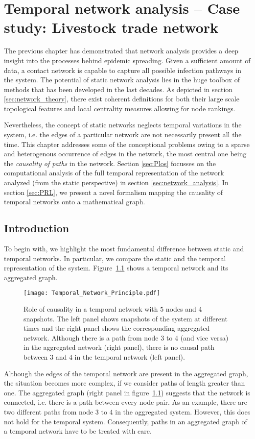 \chapter{Temporal network analysis -- Case study: Livestock trade network}\label{sec:temporal_networks}
The previous chapter has demonstrated that network analysis provides a deep insight into the processes behind epidemic spreading.
Given a sufficient amount of data, a contact network is capable to capture all possible infection pathways in the system.
The potential of static network analysis lies in the huge toolbox of methods that has been developed in the last decades.
As depicted in section \ref{sec:network_theory}, there exist coherent definitions for both their large scale topological features and local centrality measures allowing for node rankings.

Nevertheless, the concept of static networks neglects temporal variations in the system, i.e. the edges of a particular network are not necessarily present all the time.
This chapter addresses some of the conceptional problems owing to a sparse and heterogenous occurrence of edges in the network, the most central one being the \emph{causality of paths} in the network.
Section \ref{sec:Plos} focusses on the computational analysis of the full temporal representation of the network analyzed (from the static perspective) in section \ref{sec:network_analysis}.
In section \ref{sec:PRL}, we present a novel formalism mapping the causality of temporal networks onto a mathematical graph.

\section{Introduction}
To begin with, we highlight the most fundamental difference between static and temporal networks.
In particular, we compare the static and the temporal representation of the system.
Figure~\ref{fig:temporal_network_principle} shows a temporal network and its aggregated graph.
%
\begin{figure}[htb]
\begin{center}
\texttt{[image: Temporal\_Network\_Principle.pdf]}
\caption{%
Role of causality in a temporal network with $5$ nodes and $4$ snapshots.
The left panel shows snapshots of the system at different times and the right panel shows the corresponding aggregated network.
Although there is a path from node $3$ to $4$ (and vice versa) in the aggregated network (right panel), there is no causal path between $3$ and $4$ in the temporal network (left panel).
}
\label{fig:temporal_network_principle}
\end{center}
\end{figure}
%
Although the edges of the temporal network are present in the aggregated graph, the situation becomes more complex, if we consider paths of length greater than one.
The aggregated graph (right panel in figure~\ref{fig:temporal_network_principle}) suggests that the network is connected, i.e. there is a path between every node pair.
As an example, there are two different paths from node $3$ to $4$ in the aggregated system.
However, this does not hold for the temporal system.
Consequently, paths in an aggregated graph of a temporal network have to be treated with care.

